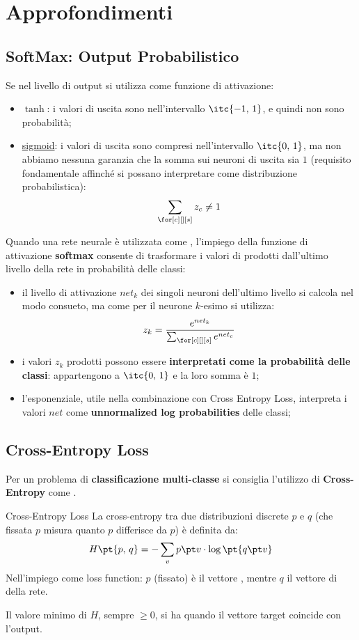 \section{Approfondimenti}\label{sec:approfondimenti} %
\subsection{SoftMax: Output Probabilistico}\label{sub:softmax} %
Se nel livello di output si utilizza come funzione di attivazione:
\begin{itemize}
    \item $\tanh$: i valori di uscita sono nell'intervallo $\itc{-1,\,1}$, e quindi non sono probabilità;
    \item \hyperref[par:sigmoid]{sigmoid}: i valori di uscita sono compresi nell'intervallo $\itc{0,\,1}$, ma non abbiamo nessuna garanzia che la somma sui neuroni di uscita sia $1$ (requisito fondamentale affinché si possano interpretare come distribuzione probabilistica):
        \[
            \sum_{\for[c][][s]}{z_c \ne 1}
        \]
\end{itemize}
Quando una rete neurale è utilizzata come , l'impiego della funzione di attivazione \textbf{softmax} consente di trasformare i valori di  prodotti dall'ultimo livello della rete in probabilità delle classi:
\begin{itemize}
    \item il livello di attivazione $net_k$ dei singoli neuroni dell'ultimo livello si calcola nel modo consueto, ma come  per il neurone $k$-esimo si utilizza:
        \[
            z_k = \frac{e^{net_k}}{\sum_{\for[c][][s]}e^{net_c}}
        \]
    \item i valori $z_k$ prodotti possono essere \textbf{interpretati come la probabilità delle classi}: appartengono a $\itc{0,\,1}$ e la loro somma è $1$;
    \item l'esponenziale, utile nella combinazione con Cross Entropy Loss, interpreta i valori $net$ come \textbf{unnormalized log probabilities} delle classi;
\end{itemize}
%
\subsection{Cross-Entropy Loss}\label{sub:cross_entropy_loss} %
Per un problema di \textbf{classificazione multi-classe} si consiglia l'utilizzo di \textbf{Cross-Entropy} come .
\begin{definition}{Cross-Entropy Loss}{}
    La cross-entropy tra due distribuzioni discrete $p$ e $q$ (che fissata $p$ misura quanto $p$ differisce da $p$) è definita da:
    \[
        H\pt{p,\,q} = -\sum_v{p\pt v \cdot \log{\pt{q\pt v}}}
    \]
    Nell'impiego come loss function: $p$ (fissato) è il vettore , mentre $q$ il vettore di  della rete.
\end{definition}
Il valore minimo di $H$, sempre $\ge 0$, si ha quando il vettore target coincide con l'output.
%
